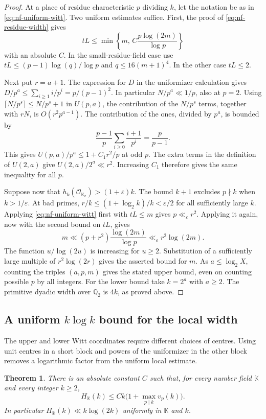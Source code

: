 \documentclass[11pt,letterpaper]{article}
\newtheorem{theorem}{Theorem}[section]
\theoremstyle{definition}
\numberwithin{equation}{section}
\begin{document}
\begin{proof}
At a place of residue characteristic $p$ dividing $k$, let the notation be
as in \eqref{eq:nf-uniform-witt}. Two uniform estimates suffice. First,
the proof of \eqref{eq:nf-residue-width} gives
\[
 tL\le\min\left\{m,\,C\frac{p\log(2m)}{\log p}\right\}
\]
with an absolute $C$. In the small-residue-field case use
$tL\le(p-1)\log(q)/\log p$ and $q\le16(m+1)^4$.
In the other case $tL\le2$.

Next put $r=a+1$. The expression for $D$ in the uniformizer calculation
gives $D/p^a\le\sum_{i\ge1}i/p^i=p/(p-1)^2$. In particular
$N/p^a\ll1/p$, also at $p=2$. Using
$\lceil N/p^s\rceil\le N/p^s+1$ in $U(p,a)$, the contribution of
the $N/p^s$ terms, together with $rN$, is $O(r^2 p^{a-1})$.
The contribution of the ones, divided by $p^a$, is bounded by
\[
 \frac{p-1}{p}\sum_{i\ge0}\frac{i+1}{p^i}
 =\frac p{p-1}.
\]
This gives $U(p,a)/p^a\le1+C_1r^2/p$ at odd $p$. The extra terms in the
definition of $U(2,a)$ give $U(2,a)/2^a\ll r^2$. Increasing $C_1$
therefore gives the same inequality for all $p$.

Suppose now that $h_k(\mathcal O_{\mathbb K_v})>(1+\varepsilon)k$.
The bound $k+1$ excludes $p\nmid k$ when $k>1/\varepsilon$.
At bad primes, $r/k\le(1+\log_2 k)/k<\varepsilon/2$ for all
sufficiently large $k$. Applying \eqref{eq:nf-uniform-witt} first
with $tL\le m$ gives $p\ll_\varepsilon r^2$. Applying it again, now
with the second bound on $tL$, gives
\[
         m\ll (p+r^2)\frac{\log(2m)}{\log p}
             \ll_\varepsilon r^2\log(2m).
\]
The function $u/\log(2u)$ is increasing for $u\ge2$. Substitution
of a sufficiently large multiple of $r^2\log(2r)$ gives the asserted
bound for $m$. As $a\le\log_2 X$, counting the triples $(a,p,m)$ gives
the stated upper bound, even on counting possible $p$ by all integers.
For the lower bound take $k=2^a$ with $a\ge2$. The primitive dyadic
width over $\mathbb Q_2$ is $4k$, as proved above.
\end{proof}

\subsection{A uniform $k\log k$ bound for the local width}
\label{sec:local-hybrid}
The upper and lower Witt coordinates require different choices of
centres. Using unit centres in a short block and powers of the
uniformizer in the other block removes a logarithmic factor from
the uniform local estimate.

\begin{theorem}\label{thm:hhybrid}
There is an absolute constant $C$ such that, for every number field
$\mathbb K$ and every integer $k\ge2$,
\[
               H_{\mathbb K}(k)\le Ck\bigl(1+\max_{p\mid k}v_p(k)\bigr).
\]
In particular $H_{\mathbb K}(k)\ll k\log(2k)$ uniformly in
$\mathbb K$ and $k$.
\end{theorem}
\end{document}
